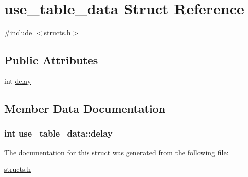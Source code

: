 \hypertarget{structuse__table__data}{\section{use\-\_\-table\-\_\-data Struct Reference}
\label{structuse__table__data}
}


{\ttfamily \#include $<$structs.\-h$>$}

\subsection*{Public Attributes}
\begin{DoxyCompactItemize}
\item 
int \hyperlink{structuse__table__data_a0bed5aa159e7438c39f1dba2a9feffaf}{delay}
\end{DoxyCompactItemize}


\subsection{Member Data Documentation}
\hypertarget{structuse__table__data_a0bed5aa159e7438c39f1dba2a9feffaf}{
\subsubsection[{delay}]{\setlength{\rightskip}{0pt plus 5cm}int use\-\_\-table\-\_\-data\-::delay}}\label{structuse__table__data_a0bed5aa159e7438c39f1dba2a9feffaf}


The documentation for this struct was generated from the following file\-:\begin{DoxyCompactItemize}
\item 
\hyperlink{structs_8h}{structs.\-h}\end{DoxyCompactItemize}

